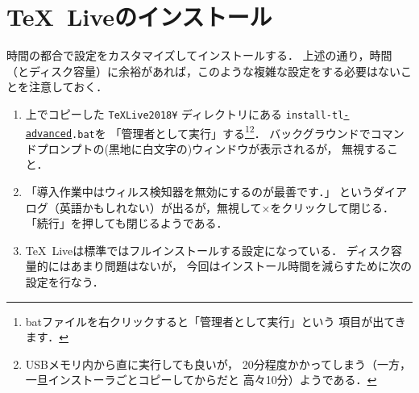 \documentclass{ltjsarticle}
\begin{document}
\section{\TeX~Liveのインストール}\label{install_tex}
時間の都合で設定をカスタマイズしてインストールする．
上述の通り，時間（とディスク容量）に余裕があれば，このような複雑な設定をする必要はないことを注意しておく．
\begin{enumerate}
  \itemsep\medskipamount


\item 上でコピーした \texttt{TeXLive2018¥} ディレクトリにある
  \texttt{install-tl\underline{-advanced}.bat}を
  「管理者として実行」する\footnote{%
    batファイルを右クリックすると「管理者として実行」という
    項目が出てきます．
  }\footnote{%
    USBメモリ内から直に実行しても良いが，
    20分程度かかってしまう（一方，一旦インストーラごとコピーしてからだと
    高々10分）ようである．
  }．
  \smallskip
  バックグラウンドでコマンドプロンプトの(黒地に白文字の)ウィンドウが表示されるが，
  無視すること．

\item 「導入作業中はウィルス検知器を無効にするのが最善です．」
  というダイアログ（英語かもしれない）が出るが，無視して×をクリックして閉じる．
  「続行」を押しても閉じるようである．

\item \TeX~Liveは標準ではフルインストールする設定になっている．
  ディスク容量的にはあまり問題はないが，
  今回はインストール時間を減らすために次の設定を行なう．


\end{enumerate}
\end{document}

